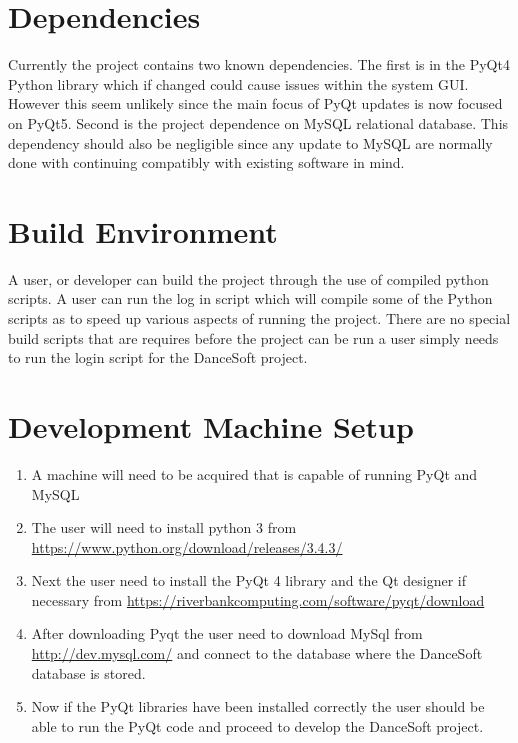 \section{Dependencies}
Currently the project contains two known dependencies. The first is in the PyQt4 Python library which if changed could cause issues within the system GUI. However this seem unlikely since the main focus of PyQt updates is now focused on PyQt5. Second is the project dependence on MySQL relational database. This dependency should also be negligible since any update to MySQL are normally done with continuing compatibly with existing software in mind.

\section{Build  Environment}
A user, or developer can build the project through the use of compiled python scripts. A user can run the log in script which will compile some of the Python scripts as to speed up various aspects of running the project. There are no special build scripts that are requires before the project can be run a user simply needs to run the login script for the DanceSoft project.

\section{Development Machine Setup}
\begin{enumerate}
\item A machine will need to be acquired that is capable of running PyQt and MySQL
\item The user will need to install python 3 from \url{https://www.python.org/download/releases/3.4.3/}
\item Next the user need to install the PyQt 4 library and the Qt designer if necessary from \url{https://riverbankcomputing.com/software/pyqt/download}
\item After downloading Pyqt the user need to download MySql from \url{http://dev.mysql.com/} and connect to the database where the DanceSoft database is stored.
\item Now if the PyQt libraries have been installed correctly the user should be able to run the PyQt code and proceed to develop the DanceSoft project.
\end{enumerate}


